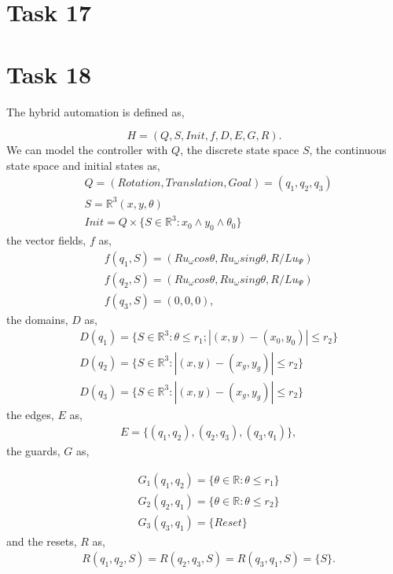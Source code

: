 \documentclass[a4paper,12pt,oneside,onecolumn]{article} %
\begin{document}
  
  
\section*{Task 17}

    

\section*{Task 18}

The hybrid automation is defined as,

\begin{equation}
    H = (Q,S,Init,f,D,E,G,R).
\end{equation}
We can model the controller with $Q$, the discrete state space $S$,
the continuous state space and initial states as,
\begin{align*}
    &Q=(Rotation,Translation,Goal)=(q_1,q_2,q_3) \\
    &S=\mathbb{R}^3 (x,y,\theta)\\
    &Init = Q \times \{ S \in \mathbb{R}^3 :x_0\wedge y_0 \wedge
    \theta_0\}
\end{align*} 
the vector fields, $f$ as,
\begin{align*}
    &f(q_1,S)=(Ru_{\omega}cos\theta,Ru_{\omega}sing\theta,R/Lu_{\Psi}) \\
    &f(q_2,S)=(Ru_{\omega}cos\theta,Ru_{\omega}sing\theta,R/Lu_{\Psi})\\
    &f(q_3,S)=(0,0,0),
\end{align*}
the domains, $D$ as,
\begin{align*}
    &D(q_1)=\{S\in \mathbb{R}^3:\theta \le r_1; |(x,y)-(x_0,y_0)|\le r_2\} \\
    &D(q_2)=\{S\in \mathbb{R}^3:|(x,y)-(x_g,y_g)| \le r_2\} \\
    &D(q_3)=\{S\in \mathbb{R}^3:|(x,y)-(x_g,y_g)| \le r_2\}
\end{align*}
the edges, $E$ as,
\begin{align*}
    &E = \{(q_1,q_2), (q_2,q_3), (q_3, q_1)\},
\end{align*}
the guards, $G$ as,

\begin{align*}
    &G_1(q_1,q_2)=\{\theta\in\mathbb{R}:\theta\le r_1\} \\
    &G_2(q_2,q_1)=\{\theta\in\mathbb{R}:\theta\le r_2\} \\
    &G_3(q_3,q_1)=\{Reset\}
\end{align*}
and the resets, $R$ as,
\begin{align*}
  &R(q_1,q_2,S)=R(q_2,q_3,S)=R(q_3,q_1,S)=\{S\}.
\end{align*}
\end{document}
